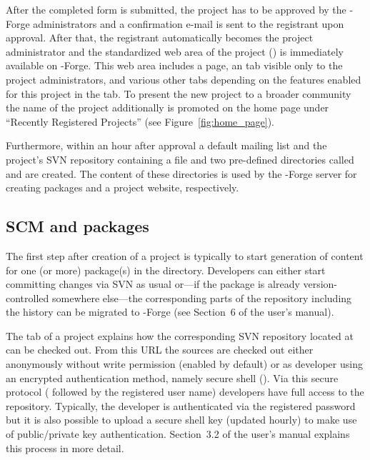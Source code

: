 After the completed form is submitted, the project has to be approved
by the \R{}-Forge administrators and a confirmation e-mail is sent to the
registrant upon approval. After that, the registrant automatically
becomes the project administrator and the standardized web area of the
project () is
immediately available on \R{}-Forge.
This web area includes a  page, an  tab
visible only to the project administrators, and various other tabs
depending on the features enabled for this project in the 
tab. To present the new project to a broader community the name of the
project additionally is promoted on the home page under ``Recently
Registered Projects'' (see Figure~\ref{fig:home_page}).

Furthermore, within an hour after approval a default mailing list and
the project's SVN repository containing a  file and two
pre-defined directories called  and  are created.
The content of these directories is used by the \R{}-Forge server
for creating \R{} packages and a project website, respectively.


\subsection{SCM and \R{} packages}

The first step after creation of a project is typically to start
generation of content for one (or more) \R{} package(s) in the 
directory. Developers can either start committing changes via SVN as usual
or---if the package is already version-controlled somewhere else---the
corresponding parts of the repository including the history can be
migrated to \R{}-Forge (see Section~6 of the user's manual).

The  tab of a project explains how the corresponding SVN
repository located at 
can be checked out. From
this URL the sources are checked out either
anonymously without write permission (enabled by default) or as
developer using an encrypted authentication method, namely secure
shell (). Via this secure protocol (
followed by the registered user name) developers have full access to the
repository. Typically, the developer is authenticated via the
registered password but it is also possible to upload a secure shell
key (updated hourly) to make use of public/private key
authentication. Section~3.2 of the user's manual explains this process
in more detail.

